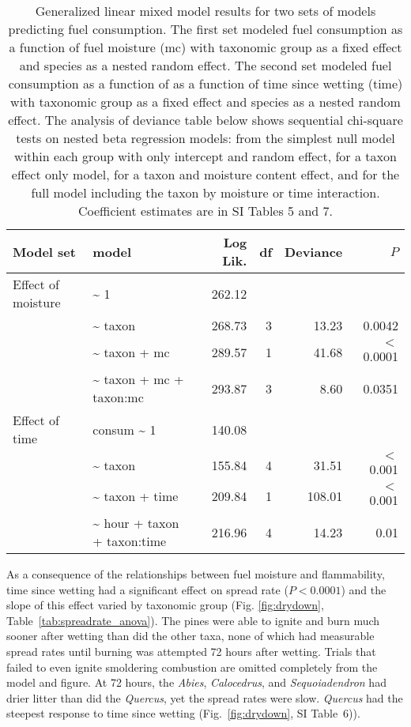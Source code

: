\documentclass[letterpaper,12pt]{article}
\begin{document}
\begin{table}[h]
  \caption{Generalized linear mixed model results for two sets of models
    predicting fuel consumption. The first set modeled fuel consumption as a
    function of fuel moisture (mc) with taxonomic group as a fixed effect and
    species as a nested random effect. The second set modeled fuel consumption
    as a function of as a function of time since wetting (time) with taxonomic
    group as a fixed effect and species as a nested random effect. The analysis
    of deviance table below shows sequential chi-square tests on nested beta
    regression models: from the simplest null model within each group with only
    intercept and random effect, for a taxon effect only model, for a taxon and
    moisture content effect, and for the full model including the taxon by
    moisture or time interaction. Coefficient estimates are in SI Tables 5 and
    7.}
  \label{tab:consume_anova}
  \centering

  \begin{tabular}{llrrrr}
\toprule
Model set & model & Log Lik. & df & Deviance & $P$ \\ 
\midrule
  Effect of moisture &   \~{} 1 & 262.12 &  &  &  \\ 
   &  \~{} taxon & 268.73 & 3 & 13.23 & 0.0042 \\ 
   & \~{} taxon + mc & 289.57 & 1 & 41.68 & $<$ 0.0001 \\ 
   & \~{} taxon + mc + taxon:mc & 293.87 & 3 & 8.60 & 0.0351 \\ 
\midrule
Effect of time &  consum \~{} 1 & 140.08 &  &  &  \\ 
 & \~{} taxon & 155.84 & 4 & 31.51 & $<$ 0.001 \\ 
 & \~{} taxon + time & 209.84 & 1 & 108.01 & $<$ 0.001 \\ 
 & \~{} hour + taxon + taxon:time & 216.96 & 4 & 14.23 & 0.01 \\ 
    \bottomrule
    \end{tabular}
\end{table}


As a consequence of the relationships between fuel moisture and flammability,
time since wetting had a significant effect on spread rate ($P < 0.0001$) and
the slope of this effect varied by taxonomic group (Fig. \ref{fig:drydown},
Table~\ref{tab:spreadrate_anova}). The pines were able to ignite and burn much
sooner after wetting than did the other taxa, none of which had measurable
spread rates until burning was attempted 72 hours after wetting. Trials that
failed to even ignite smoldering combustion are omitted completely from the
model and figure. At 72 hours, the \emph{Abies}, \emph{Calocedrus}, and
\emph{Sequoiadendron} had drier litter than did the \emph{Quercus}, yet the
spread rates were slow. \emph{Quercus} had the steepest response to time since
wetting (Fig.~\ref{fig:drydown}, SI Table~6)).
\end{document}
